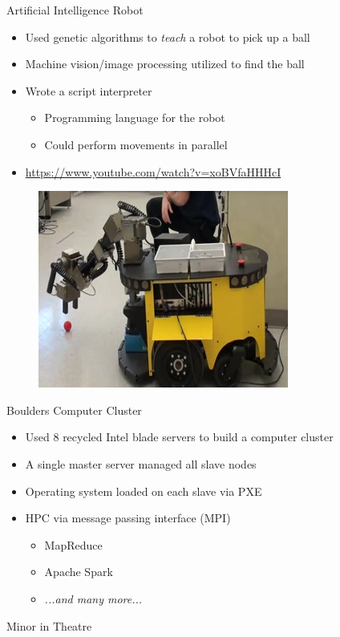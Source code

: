 \documentclass{beamer}
\begin{document}
\begin{frame}{Artificial Intelligence Robot}
\begin{itemize}
	\item Used genetic algorithms to \emph{teach} a robot to pick up a ball
	\item Machine vision/image processing utilized to find the ball
	\item Wrote a script interpreter
	\begin{itemize}
		\item Programming language for the robot
		\item Could perform movements in parallel
	\end{itemize}
	\item \url{https://www.youtube.com/watch?v=xoBVfaHHHcI}
\end{itemize}
\begin{figure}
	\includegraphics[width=.45\linewidth]{img/robot.png}
\end{figure}
\end{frame}

\begin{frame}{Boulders Computer Cluster}
\begin{itemize}
	\item Used 8 recycled Intel blade servers to build a computer cluster
	\item A single master server managed all slave nodes
	\item Operating system loaded on each slave via PXE
	\item HPC via message passing interface (MPI)
	\begin{itemize}
		\item MapReduce
		\item Apache Spark
		\item \emph{...and many more...}
	\end{itemize}
\end{itemize}
\end{frame}

\begin{frame}{Minor in Theatre}

\end{frame}
\end{document}
